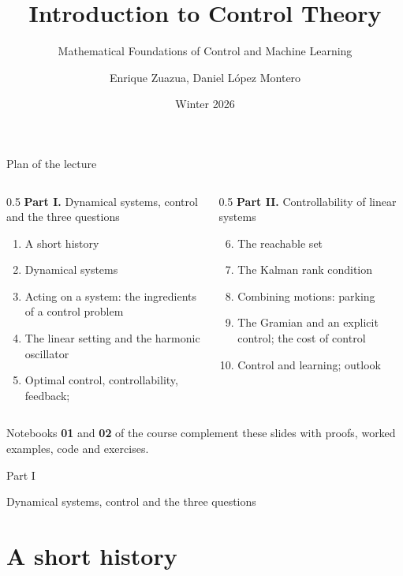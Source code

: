 \documentclass[10pt]{beamer}
\title{Introduction to Control Theory}
\subtitle{Mathematical Foundations of Control and Machine Learning}
\author{Enrique Zuazua, Daniel L\'opez Montero}
\date{Winter 2026}
\institute{FAU Erlangen-N\"urnberg}
\begin{document}
\maketitle

\begin{frame}{Plan of the lecture}
\begin{columns}[T]
\begin{column}{0.5\textwidth}
\alert{\textbf{Part I.}} Dynamical systems, control and the three questions
\begin{enumerate}
\item A short history
\item Dynamical systems
\item Acting on a system: the ingredients of a control problem
\item The linear setting and the harmonic oscillator
\item Optimal control, controllability, feedback;
\end{enumerate}
\end{column}
\begin{column}{0.5\textwidth}
\alert{\textbf{Part II.}} Controllability of linear systems
\begin{enumerate}\setcounter{enumi}{5}
\item The reachable set
\item The Kalman rank condition
\item Combining motions: parking
\item The Gramian and an explicit control; the cost of control
\item Control and learning; outlook
\end{enumerate}
\end{column}
\end{columns}

\bigskip
\small
Notebooks \textbf{01} and \textbf{02} of the course complement these slides with proofs, worked examples, code and exercises.
\end{frame}


\begin{frame}[standout]
Part I

\medskip
\normalsize Dynamical systems, control and the three questions
\end{frame}


\section{A short history}
\end{document}
